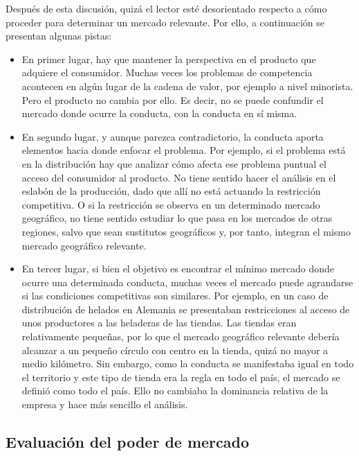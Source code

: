 \documentclass[
  12pt,
  spanish,
]{book}
\begin{document}
Después de esta discusión, quizá el lector esté desorientado respecto a
cómo proceder para determinar un mercado relevante. Por ello, a
continuación se presentan algunas pistas:

\begin{itemize}
\item
  En primer lugar, hay que mantener la perspectiva en el producto que
  adquiere el consumidor. Muchas veces los problemas de competencia
  acontecen en algún lugar de la cadena de valor, por ejemplo a nivel
  minorista. Pero el producto no cambia por ello. Es decir, no se puede
  confundir el mercado donde ocurre la conducta, con la conducta en sí
  misma.
\item
  En segundo lugar, y aunque parezca contradictorio, la conducta aporta
  elementos hacia donde enfocar el problema. Por ejemplo, si el problema
  está en la distribución hay que analizar cómo afecta ese problema
  puntual el acceso del consumidor al producto. No tiene sentido hacer
  el análisis en el eslabón de la producción, dado que allí no está
  actuando la restricción competitiva. O si la restricción se observa en
  un determinado mercado geográfico, no tiene sentido estudiar lo que
  pasa en los mercados de otras regiones, salvo que sean sustitutos
  geográficos y, por tanto, integran el mismo mercado geográfico
  relevante.
\item
  En tercer lugar, si bien el objetivo es encontrar el mínimo mercado
  donde ocurre una determinada conducta, muchas veces el mercado puede
  agrandarse si las condiciones competitivas son similares. Por ejemplo,
  en un caso de distribución de helados en Alemania se presentaban
  restricciones al acceso de unos productores a las heladeras de las
  tiendas. Las tiendas eran relativamente pequeñas, por lo que el
  mercado geográfico relevante debería alcanzar a un pequeño círculo con
  centro en la tienda, quizá no mayor a medio kilómetro. Sin embargo,
  como la conducta se manifestaba igual en todo el territorio y este
  tipo de tienda era la regla en todo el país, el mercado se definió
  como todo el país. Ello no cambiaba la dominancia relativa de la
  empresa y hace más sencillo el análisis.
\end{itemize}

\hypertarget{evaluaciuxf3n-del-poder-de-mercado}{%
\subsection{Evaluación del poder de
mercado}\label{evaluaciuxf3n-del-poder-de-mercado}}
\end{document}
